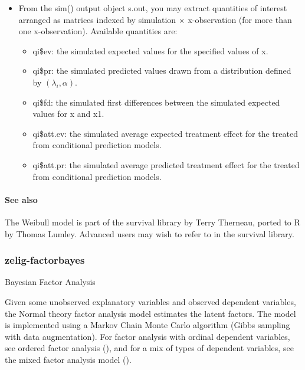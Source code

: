 \documentclass[letterpaper,10pt,english]{sphinxmanual}
\begin{document}
\begin{itemize}
\begin{itemize}
\end{itemize}

\item {} 
From the sim() output object s.out, you may extract quantities of
interest arranged as matrices indexed by simulation \(\times\)
x-observation (for more than one x-observation). Available quantities
are:
\begin{itemize}
\item {} 
qi\$ev: the simulated expected values for the specified values of
x.

\item {} 
qi\$pr: the simulated predicted values drawn from a distribution
defined by \((\lambda_i, \alpha)\).

\item {} 
qi\$fd: the simulated first differences between the simulated
expected values for x and x1.

\item {} 
qi\$att.ev: the simulated average expected treatment effect for the
treated from conditional prediction models.

\item {} 
qi\$att.pr: the simulated average predicted treatment effect for
the treated from conditional prediction models.

\end{itemize}

\end{itemize}


\paragraph{See also}
\label{zelig-weibull:see-also}
The Weibull model is part of the survival library by Terry Therneau,
ported to R by Thomas Lumley. Advanced users may wish to refer to
 in the survival library.


\subsubsection{zelig-factorbayes}
\label{zelig-factorbayes:zelig-factorbayes}\label{zelig-factorbayes::doc}\label{zelig-factorbayes:zfactorbayes}
Bayesian Factor Analysis

Given some unobserved explanatory variables and observed dependent
variables, the Normal theory factor analysis model estimates the latent
factors. The model is implemented using a Markov Chain Monte Carlo
algorithm (Gibbs sampling with data augmentation). For factor analysis
with ordinal dependent variables, see ordered factor analysis (), and
for a mix of types of dependent variables, see the mixed factor analysis
model ().
\end{document}
